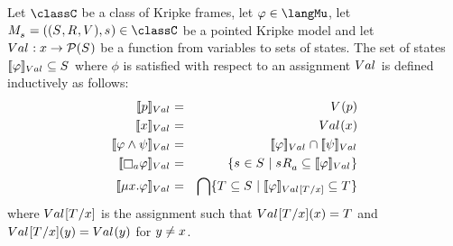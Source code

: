 \begin{definition}\label{mu-semantics}
Let $\classC$ be a class of Kripke frames, let $\phi \in \langMu$, let $\kPModelAndTuple{\kStateS} \in \classC$ be a pointed Kripke model and let $\kAssignment : \varX \to \powerset(\kStates)$ be a function from variables to sets of states.
The set of states $\interpretation[\kAssignment]{\phi} \subseteq \kStates$ where $\phi$ is satisfied with respect to an assignment $\kAssignment$ is defined inductively as follows:
\begin{eqnarray*}
    \interpretation[\kAssignment]{\atomP} &=& \kValuation(\atomP)\\
    \interpretation[\kAssignment]{\varX} &=& \kAssignment(\varX)\\
    \interpretation[\kAssignment]{\phi \land \psi} &=& \interpretation[\kAssignment]{\phi} \cap \interpretation[\kAssignment]{\psi}\\
    \interpretation[\kAssignment]{\necessaryA \phi} &=& \{ \kStateS \in \kStates \mid \kStateS \kAccessibility{\agentA} \subseteq \interpretation[\kAssignment]{\phi} \}\\
    \interpretation[\kAssignment]{\lfp{\varX} \phi} &=& \bigcap \{ \kStatesT \subseteq \kStates \mid \interpretation[\kAssignmentSubstitute{\kStatesT}{\varX}]{\phi} \subseteq \kStatesT \}
\end{eqnarray*}
where $\kAssignmentSubstitute{\kStatesT}{\varX}$ is the assignment such that $\kAssignmentSubstitute{\kStatesT}{\varX}(\varX) = \kStatesT$ and $\kAssignmentSubstitute{\kStatesT}{\varX}(\varY) = \kAssignment(\varY)$ for $y \neq x$. 
\end{definition}
